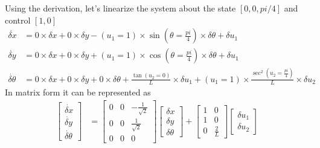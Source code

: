 Using the derivation, let's linearize the system about the state $[{}0,{}0, {}pi/4{}]$ and control $[{}1, {}0{}]$
\begin{align}
    \dot{\delta x} &= 0 \times \delta x + 0 \times \delta y - (u_1=1)\times\sin(\theta = \frac{pi}{4}) \times \delta \theta + \delta u_1 \\
    \dot{\delta y} &= 0 \times \delta x + 0 \times \delta y + (u_1=1)\times\cos(\theta = \frac{pi}{4}) \times \delta \theta + \delta u_1 \\
    \dot{\delta \theta} &=  0 \times \delta x + 0 \times \delta y + 0\times\delta \theta + \frac{\tan (u_2=0)}{L} \times \delta u_1+ (u_1=1)\times\frac{\sec^2 (u_2=\frac{pi}{4})}{L}\times\delta u_2 
\end{align}
In matrix form it can be represented as
\begin{align}
    \begin{bmatrix}
          \dot{\delta x}\\
          \dot{\delta y} \\
         \dot {\delta \theta}
    \end{bmatrix} & =  \begin{bmatrix}
    0 & 0 & -\frac{1}{\sqrt{2}} \\
    0 & 0 & \frac{1}{\sqrt{2}} \\
    0 & 0 & 0
    \end{bmatrix}
    \begin{bmatrix}
          \delta x\\
          \delta y \\
         \delta \theta
    \end{bmatrix} + \begin{bmatrix}1 & 0 \\ 1 & 0 \\ 0 & \frac{2}{L}\end{bmatrix}\begin{bmatrix}\delta u_1 \\ \delta u_2\end{bmatrix}
\end{align}

